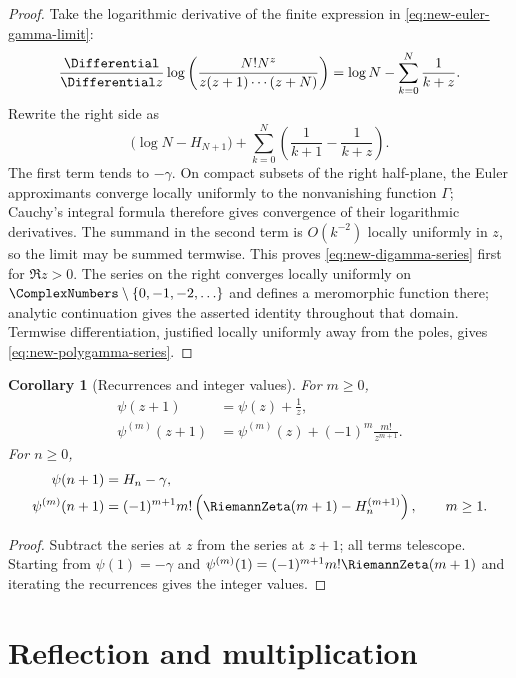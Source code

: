 \documentclass[11pt,a4paper,oneside,openany]{book}
\newtheorem{corollary}[theorem]{Corollary}
\theoremstyle{definition}
\theoremstyle{remark}
\begin{document}
\begin{proof}
Take the logarithmic derivative of the finite expression in
\eqref{eq:new-euler-gamma-limit}:
\[
 \frac{\Differential}{\Differential z}\log\left(
 \frac{N!N^z}{z(z+1)\cdots(z+N)}\right)
 =\log N-\sum_{k=0}^N\frac1{k+z}.
\]
Rewrite the right side as
\[
 \bigl(\log N-H_{N+1}\bigr)
 +\sum_{k=0}^N\left(\frac1{k+1}-\frac1{k+z}\right).
\]
The first term tends to $-\gamma$.  On compact subsets of the right
half-plane, the Euler approximants converge locally uniformly to the nonvanishing
function $\Gamma$; Cauchy's integral formula therefore gives convergence of
their logarithmic derivatives.  The summand in the second term is $O(k^{-2})$
locally uniformly in $z$, so the limit may be summed termwise.  This proves
\eqref{eq:new-digamma-series} first for $\Re z>0$.  The series on the right
converges locally uniformly on
$\ComplexNumbers\setminus\{0,-1,-2,\ldots\}$ and defines a meromorphic function there;
analytic continuation gives the asserted identity throughout that domain.
Termwise differentiation, justified locally uniformly away from the poles, gives
\eqref{eq:new-polygamma-series}.
\end{proof}

\begin{corollary}[Recurrences and integer values]\label{cor:new-polygamma-integers}
For $m\ge0$,
\begin{align}
 \psi(z+1)&=\psi(z)+\frac1z,
 \label{eq:new-digamma-recurrence}\\
 \psi^{(m)}(z+1)&=\psi^{(m)}(z)
 +(-1)^m\frac{m!}{z^{m+1}}.
 \label{eq:new-polygamma-recurrence}
\end{align}
For $n\ge0$,
\begin{align}
 \psi(n+1)&=H_n-\gamma,
 \label{eq:new-digamma-integer}\\
 \psi^{(m)}(n+1)&=(-1)^{m+1}m!
 \left(\RiemannZeta(m+1)-H_n^{(m+1)}\right),\qquad m\ge1.
 \label{eq:new-polygamma-integer}
\end{align}
\end{corollary}

\begin{proof}
Subtract the series at $z$ from the series at $z+1$; all terms telescope.
Starting from $\psi(1)=-\gamma$ and
$\psi^{(m)}(1)=(-1)^{m+1}m!\RiemannZeta(m+1)$ and iterating the recurrences gives
the integer values.
\end{proof}

\section{Reflection and multiplication}
\end{document}
